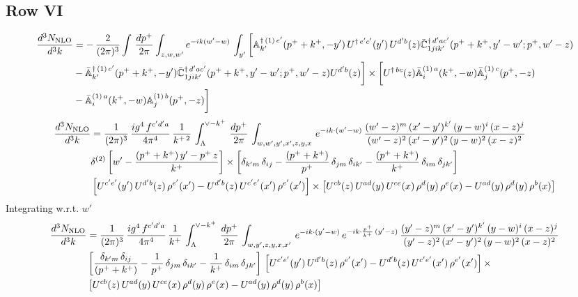 \documentclass[9pt]{article}
\def\mf#1{\mathbb{#1}}
\numberwithin{equation}{section}
\begin{document}
\subsection{Row VI\,}
\begin{align}
     \frac{d^{3}N_{\rm NLO}}{d^{3}k} & =  -\, \frac{2}{(2\pi)^{3}} \int\, \frac{dp^{+}}{2\pi}\int_{z,w,w^{\prime}} e^{-ik(w^{\prime}-w)}\, \int_{y^{\prime}}\bigg[\mf{A}^{\dagger\, (1)\,e^{\prime}}_{k^{\prime}}(p^{+}+k^{+},-y^{\prime})\,U^{\dagger\, e^{\prime}c^{\prime}}(y^{\prime})\,U^{d^{\prime}b}(z) \Bar{\mf{C}}^{\dagger\, d^{\prime}ac^{\prime}}_{1jik^{\prime}}(p^{+}+k^{+},y^{\prime}-w^{\prime}; p^{+},w^{\prime}-z) \notag \\ & -\Bar{\mf{A}}^{\dagger\, (1)\,c^{\prime}}_{k^{\prime}}(p^{+}+k^{+},-y^{\prime})\Bar{\mf{C}}^{\dagger\, d^{\prime}ac^{\prime}}_{1jik^{\prime}}(p^{+}+k^{+},y^{\prime}-w^{\prime}; p^{+},w^{\prime}-z)U^{d^{\prime}b}(z)\bigg] \times \bigg[U^{\dagger\,bc}(z)\Bar{\mf{A}}^{(1)\, a}_{i}(k^{+},- w)\Bar{\mf{A}}^{(1)\, c}_{j}(p^{+},-z)\notag \\ & -\Bar{\mf{A}}^{(1)\, a}_{i}(k^{+},- w) \mf{A}^{(1)\, b}_{j}(p^{+},- z)\bigg]\nonumber
\end{align}
\begin{align}
     \frac{d^{3}N_{\rm NLO}}{d^{3}k} & =  \frac{1}{(2\pi)^{3}}\,\frac{ig^{4}\,f^{c'd'a}}{4\pi^{4}}\, \frac{1}{k^{+\,2}}\,\int_{\Lambda}^{\vee-k^{+}}\, \frac{dp^{+}}{2\pi}\, \int_{w,w',y',x',z,y,x}\, e^{-ik\cdot (w'-w)}\, \frac{(w'-z)^{m}\,(x'-y')^{k'}\,(y-w)^{i}\,(x-z)^{j}}{(w'-z)^{2}\,(x'-y')^{2}\,(y-w)^{2}\,(x-z)^{2}}\notag \\ & \delta^{(2)}\left[w'-\frac{(p^{+}+k^{+})\,y'-p^{+}\,z}{k^{+}}\right]\times \left[\delta_{k'm}\,\delta_{ij}-\frac{(p^{+}+k^{+})}{p^{+}}\,\delta_{jm}\,\delta_{ik'}-\frac{(p^{+}+k^{+})}{k^{+}}\, \delta_{im}\, \delta_{jk'}\right]\notag \\ & \left[U^{c'e'}(y')\,U^{d'b}(z)\,\rho^{e'}(x')-U^{d'b}(z)\,U^{c'e'}(x')\,\rho^{e'}(x')\right]\times \left[U^{cb}(z)\,U^{ad}(y)\,U^{ce}(x)\,\rho^{d}(y)\,\rho^{e}(x)-U^{ad}(y)\,\rho^{d}(y)\,\rho^{b}(x)\right]
\end{align}
Integrating w.r.t. $w'$
\begin{align}
     \frac{d^{3}N_{\rm NLO}}{d^{3}k} & = \frac{1}{(2\pi)^{3}}\, \frac{ig^{4}\,f^{c'd'a}}{4\pi^{4}}\, \frac{1}{k^{+}}\,\int_{\Lambda}^{\vee-k^{+}}\, \frac{dp^{+}}{2\pi}\, \int_{w,y',z,y,x,x'}\, e^{-ik\cdot (y'-w)}\, e^{-ik\cdot \frac{p^{+}}{k^{+}}\,(y'-z)}\,\frac{(y'-z)^{m}\,(x'-y')^{k'}\,(y-w)^{i}\,(x-z)^{j}}{(y'-z)^{2}\,(x'-y')^{2}\,(y-w)^{2}\,(x-z)^{2}}\notag \\ & \left[\frac{\delta_{k'm}\,\delta_{ij}}{(p^{+}+k^{+})}-\frac{1}{p^{+}}\,\delta_{jm}\,\delta_{ik'}-\frac{1}{k^{+}}\, \delta_{im}\, \delta_{jk'}\right]\, \left[U^{c'e'}(y')\,U^{d'b}(z)\,\rho^{e'}(x')-U^{d'b}(z)\,U^{c'e'}(x')\,\rho^{e'}(x')\right]\times\notag \\ &  \left[U^{cb}(z)\,U^{ad}(y)\,U^{ce}(x)\,\rho^{d}(y)\,\rho^{e}(x)-U^{ad}(y)\,\rho^{d}(y)\,\rho^{b}(x)\right]
\end{align}
\end{document}
